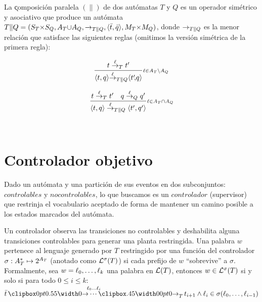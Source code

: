 \begin{definition}  \label{def:parcomp}
	La \k{composición paralela} $(\|)$ de dos autómatas $T$ y $Q$ es un operador simétrico y asociativo que produce un autómata $T \| Q = (S_T {\times} S_Q, A_T {\cup} 
	A_Q, \rightarrow_{T\|Q}, \langle\bar{t},\bar{q}\rangle, M_T {\times} M_Q)$, donde $\rightarrow_{T\|Q}$ es la menor relación que satisface las siguientes reglas (omitimos la versión simétrica de la primera regla):
	
	\begin{normalsize}
		\centering
		\vspace{-18pt}
		\hspace{-50pt}
		\begin{minipage}{0.30\linewidth}
			\[ 
			\frac{t \overset{\ell}{\rightarrow}_{T} t'}{\langle t,q\rangle {\overset{\ell}{\rightarrow}_{T\|Q}} \langle t'\!,\!q\rangle }{{\scriptstyle \ell \in A_{T} {\setminus} A_{Q}}} 
			\]
		\end{minipage} 
		\hspace{40pt}
		\begin{minipage}{0.30\linewidth}
			\[ 
			\frac{t \overset{\ell}{\rightarrow}_{T} t' \quad q \overset{\ell}{\rightarrow}_{Q} q'}{\langle t,q\rangle \overset{\ell}{\rightarrow}_{T\|Q} \langle t',q'\rangle}{{\scriptstyle \ell \in A_{T} {\cap} A_{Q}}}
			\]
		\end{minipage} \\[15pt]
	\end{normalsize}
\end{definition}

\section{Controlador objetivo}

Dado un autómata y una partición de sus eventos en dos subconjuntos: $controlables$ y $no controlables$, lo que buscamos es un $controlador$ (supervisor) que restrinja el vocabulario aceptado de forma de mantener un camino posible a los estados marcados del autómata.

Un controlador observa las transiciones no controlables y deshabilita alguna transiciones controlables para generar una planta restringida. Una palabra $w$ pertenece al lenguaje generado por $T$ restringido por una función del controlador $\sigma : A_T^* \mapsto 2^{A_T}$ (anotado como $\mathcal{L}^\sigma(T)$) si cada prefijo de $w$ ``sobrevive'' a $\sigma$.
Formalmente, sea $w = \ell_0,\ldots,\ell_k$ una palabra en $\mathcal{L}(T)$, entonces $w \in \mathcal{L}^\sigma(T)$ si y solo si para todo $0 \leq i \leq k$:
$
\init{t} \run{\,\l_0}{\l_i}{T} t_{i+1} \wedge \l_i \in \sigma(\l_0,\ldots,\l_{i-1})
$

